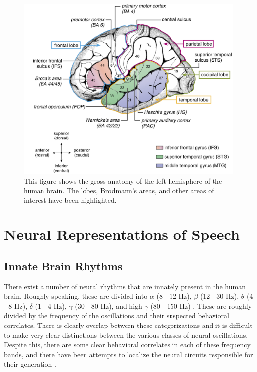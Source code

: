 \documentclass[titlepage]{article}
\begin{document}
    \begin{figure}
      \centering
      \includegraphics[scale=0.25]{primaryAuditoryAnatomy}
      \caption{This figure shows the gross anatomy of the left hemisphere
      of the human brain. The lobes, Brodmann's areas, and other areas
      of interest have been highlighted. \cite{Friederici2011}}
      \label{primaryAuditoryAnatomy}
    \end{figure}

\section{Neural Representations of Speech} \label{higher}

  \subsection{Innate Brain Rhythms} \label{innateBrainRhythms}

    There exist a number of neural rhythms that are innately present in the human brain. Roughly
    speaking, these are divided into $\alpha$ (8 - 12 Hz), $\beta$ (12 - 30 Hz),
    $\theta$ (4 - 8 Hz), $\delta$ (1 - 4 Hz),
    $\gamma$ (30 - 80 Hz), and high $\gamma$ (80 - 150 Hz) \cite{Muresan2008,Rangaswamy2002}. These are roughly divided by
    the frequency of the oscillations and their suspected behavioral correlates. There is clearly
    overlap between these categorizations and it is difficult to make very clear distinctions between
    the various classes of neural oscillations. Despite this, there are some clear behavioral correlates
    in each of these frequency bands, and there have been attempts to localize the neural circuits
    responsible for their generation \cite{Michel1992}.
\end{document}
